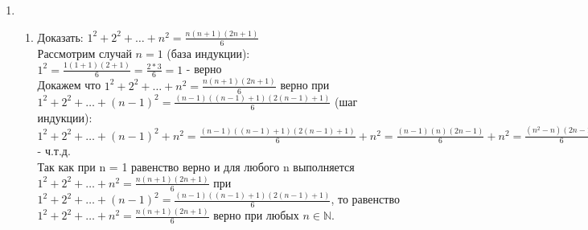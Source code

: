 \documentclass[a4paper]{article}
\renewcommand{\f}[2]{\frac{#1}{#2}}
\newcommand{\NN}{\mathbb{N}}
\begin{document}
\begin{enumerate}
\begin{enumerate}
    \end{enumerate}
    \item[\textbf{3.}] \indent
    \begin{enumerate}
        \item[(a)] Доказать: $1^2+2^2+\dots+n^2=\f{n(n+1)(2n+1)}{6}$\\
        Рассмотрим случай $n=1$ (база индукции):\\
        $1^2=\f{1(1+1)(2+1)}{6}=\f{2*3}{6}=1$ - верно\\
        Докажем что $1^2+2^2+\dots+n^2=\f{n(n+1)(2n+1)}{6}$ верно при $1^2+2^2+\dots+(n-1)^2=\f{(n-1)((n-1)+1)(2(n-1)+1)}{6}$ (шаг индукции):\\
        $1^2+2^2+\dots+(n-1)^2+n^2 = \f{(n-1)((n-1)+1)(2(n-1)+1)}{6}+n^2 = \f{(n-1)(n)(2n-1)}{6}+n^2 = \f{(n^2-n)(2n-1)}{6}+n^2 = \f{2n^3-2n^2-n^2+n}{6}+n^2 = \f{2n^3-3n^2+n}{6}+\f{6n^2}{6} = \f{2n^3+3n^2+n}{6} =  \f{n(2n^+3n+1)}{6} = \f{n(2n^+3n+1)}{6} = \f{n(n+1)(2n+1)}{6}$ - ч.т.д.\\
        Так как при n = 1 равенство верно и для любого n выполняется $1^2+2^2+\dots+n^2=\f{n(n+1)(2n+1)}{6}$ при $1^2+2^2+\dots+(n-1)^2=\f{(n-1)((n-1)+1)(2(n-1)+1)}{6}$, то равенство $1^2+2^2+\dots+n^2=\f{n(n+1)(2n+1)}{6}$ верно при любых $n \in \NN$.\\
    

\end{enumerate}
\end{enumerate}
\end{document}
